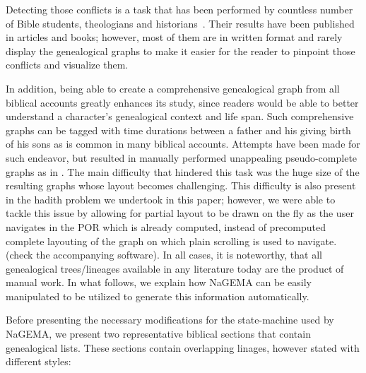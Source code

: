 \documentclass[11pt]{article}
\begin{document}
Detecting those conflicts is a task that has been performed by countless 
number of Bible students, theologians and historians~\cite{catholicEncyclopedia:Online,Belote:Online,completeBibleGenealogy:Online}. 
Their results have been published in articles and books; however, most of them are in written format 
and rarely display the genealogical graphs to make it easier for the reader to pinpoint those conflicts and visualize them. 

In addition, being able to create a comprehensive genealogical graph from all biblical accounts greatly enhances its study,
since readers would be able to better understand a character's genealogical context and life span. Such comprehensive graphs can be tagged
with time durations between a father and his giving birth of his sons as is common in many biblical accounts. 
Attempts have been made for such endeavor, but resulted in manually performed unappealing pseudo-complete graphs as in \cite{Belote:Online,SoulLiberty:Online}. The main difficulty that hindered this task was the huge size of the resulting graphs whose layout becomes
challenging. This difficulty is also present in the hadith problem we undertook in this paper; however, we were able to tackle this issue by 
allowing for partial layout to be drawn on the fly as the user navigates in the POR which is already computed, 
instead of precomputed complete layouting of the graph on which plain scrolling is used to navigate. (check the accompanying software).
In all cases, it is noteworthy, that all genealogical trees/lineages available in any literature today are the product of manual work. 
In what follows, we explain how NaGEMA can be easily manipulated to be utilized to generate this information automatically.


Before presenting the necessary modifications for the state-machine used by NaGEMA, we present two representative biblical sections that
contain genealogical lists. These sections contain overlapping linages, however stated with different styles: \\
\end{document}
